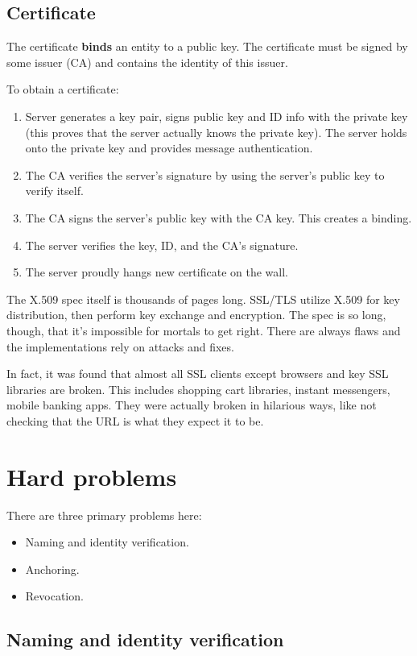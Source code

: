 \documentclass[12pt]{article}
\begin{document}
\subsection*{Certificate}

The certificate \textbf{binds} an entity to a public key. The certificate must be signed by some issuer (CA) and contains the identity of this issuer.

To obtain a certificate:
\begin{enumerate}
\item Server generates a key pair, signs public key and ID info with the private key (this proves that the server actually knows the private key). The server holds onto the private key and provides message authentication.
\item The CA verifies the server's signature by using the server's public key to verify itself.
\item The CA signs the server's public key with the CA key. This creates a binding.
\item The server verifies the key, ID, and the CA's signature.
\item The server proudly hangs new certificate on the wall.
\end{enumerate}

The X.509 spec itself is thousands of pages long. SSL/TLS utilize X.509 for key distribution, then perform key exchange and encryption. The spec is so long, though, that it's impossible for mortals to get right. There are always flaws and the implementations rely on attacks and fixes.

In fact, it was found that almost all SSL clients except browsers and key SSL libraries are broken. This includes shopping cart libraries, instant messengers, mobile banking apps. They were actually broken in hilarious ways, like not checking that the URL is what they expect it to be.

\section*{Hard problems}

There are three primary problems here:
\begin{itemize}
\item Naming and identity verification.
\item Anchoring.
\item Revocation.
\end{itemize}

\subsection*{Naming and identity verification}
\end{document}
